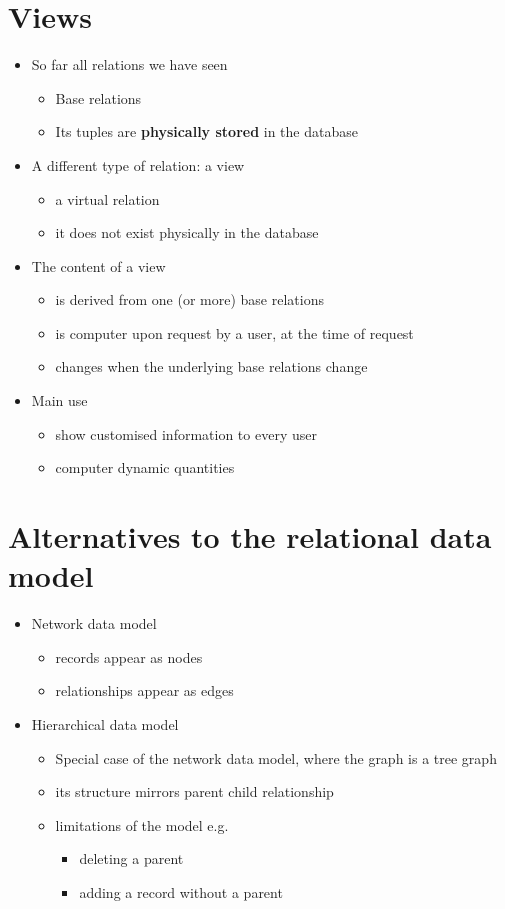 \documentclass{article}[18pt]
\begin{document}
\section{Views}
\begin{itemize}
\item So far all relations we have seen
\begin{itemize}
\item Base relations
\item Its tuples are \textbf{physically stored} in the database
\end{itemize}
\item A different type of relation: a view
\begin{itemize}
\item a virtual relation
\item it does not exist physically in the database
\end{itemize}
\item The content of a view
\begin{itemize}
\item is derived from one (or more) base relations
\item is computer upon request by a user, at the time of request
\item changes when the underlying base relations change
\end{itemize}
\item Main use
\begin{itemize}
\item show customised information to every user
\item computer dynamic quantities
\end{itemize}
\end{itemize}
\section{Alternatives to the relational data model}
\begin{itemize}
\item Network data model
\begin{itemize}
\item records appear as nodes
\item relationships appear as edges
\end{itemize}

\item Hierarchical data model
\begin{itemize}
\item Special case of the network data model, where the graph is a tree graph
\item its structure mirrors parent child relationship
\item limitations of the model e.g.
\begin{itemize}
\item deleting a parent
\item adding a record without a parent
\end{itemize}
\end{itemize}
\end{itemize}
\end{document}

